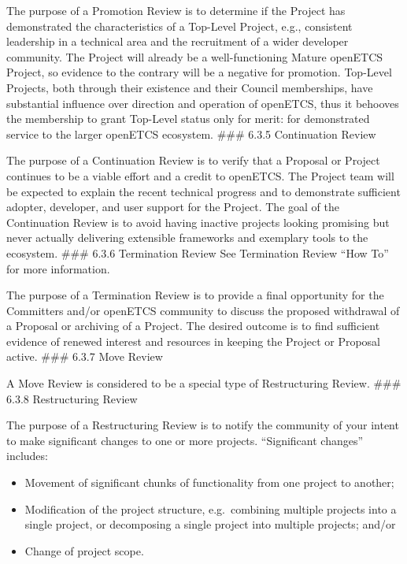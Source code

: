 The purpose of a Promotion Review is to determine if the Project has
demonstrated the characteristics of a Top-Level Project, e.g.,
consistent leadership in a technical area and the recruitment of a wider
developer community. The Project will already be a well-functioning
Mature openETCS Project, so evidence to the contrary will be a negative
for promotion. Top-Level Projects, both through their existence and
their Council memberships, have substantial influence over direction and
operation of openETCS, thus it behooves the membership to grant
Top-Level status only for merit: for demonstrated service to the larger
openETCS ecosystem. \#\#\# 6.3.5 Continuation Review

The purpose of a Continuation Review is to verify that a Proposal or
Project continues to be a viable effort and a credit to openETCS. The
Project team will be expected to explain the recent technical progress
and to demonstrate sufficient adopter, developer, and user support for
the Project. The goal of the Continuation Review is to avoid having
inactive projects looking promising but never actually delivering
extensible frameworks and exemplary tools to the ecosystem. \#\#\# 6.3.6
Termination Review See Termination Review ``How To'' for more
information.

The purpose of a Termination Review is to provide a final opportunity
for the Committers and/or openETCS community to discuss the proposed
withdrawal of a Proposal or archiving of a Project. The desired outcome
is to find sufficient evidence of renewed interest and resources in
keeping the Project or Proposal active. \#\#\# 6.3.7 Move Review

A Move Review is considered to be a special type of Restructuring
Review. \#\#\# 6.3.8 Restructuring Review

The purpose of a Restructuring Review is to notify the community of your
intent to make significant changes to one or more projects.
``Significant changes'' includes:

\begin{itemize}

\item
  Movement of significant chunks of functionality from one project to
  another;
\item
  Modification of the project structure, e.g.~combining multiple
  projects into a single project, or decomposing a single project into
  multiple projects; and/or
\item
  Change of project scope.
\end{itemize}

